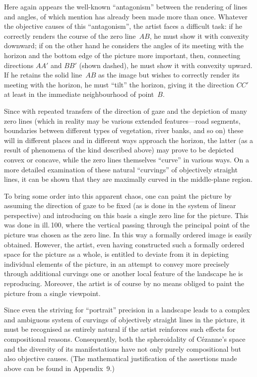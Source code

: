 Here again appears the well-known ``antagonism'' between the rendering of lines and
angles, of which mention has already been made more than once. Whatever the objective
causes of this ``antagonism'', the artist faces a difficult task: if he correctly
renders the course of the zero line~$AB$, he must show it with convexity downward;
if on the other hand he considers the angles of its meeting with the horizon and the
bottom edge of the picture more important, then, connecting directions $AA'$ and
$BB'$ (shown dashed), he must show it with convexity upward. If he retains the solid
line~$AB$ as the image but wishes to correctly render its meeting with the horizon,
he must ``tilt'' the horizon, giving it the direction $CC'$ at least in the
immediate neighbourhood of point~$B$.


Since with repeated transfers of the direction of gaze and the depiction of many
zero lines (which in reality may be various extended features---road segments,
boundaries between different types of vegetation, river banks, and so on) these
will in different places and in different ways approach the horizon, the latter (as
a result of phenomena of the kind described above) may prove to be depicted convex
or concave, while the zero lines themselves ``curve'' in various ways. On a more
detailed examination of these natural ``curvings'' of objectively straight lines, it
can be shown that they are maximally curved in the middle-plane region.

To bring some order into this apparent chaos, one can paint the picture by assuming
the direction of gaze to be fixed (as is done in the system of linear perspective)
and introducing on this basis a single zero line for the picture. This was done in
ill.\,100, where the vertical passing through the principal point of the picture was
chosen as the zero line. In this way a formally ordered image is easily obtained.
However, the artist, even having constructed such a formally ordered space for the
picture as a whole, is entitled to deviate from it in depicting individual elements
of the picture, in an attempt to convey more precisely through additional curvings
one or another local feature of the landscape he is reproducing. Moreover, the
artist is of course by no means obliged to paint the picture from a single viewpoint.

Since even the striving for ``portrait'' precision in a landscape leads to a complex
and ambiguous system of curvings of objectively straight lines in the picture, it
must be recognised as entirely natural if the artist reinforces such effects for
compositional reasons. Consequently, both the spheroidality of Cézanne's space and
the diversity of its manifestations have not only purely compositional but also
objective causes. (The mathematical justification of the assertions made above can
be found in Appendix~9.)

